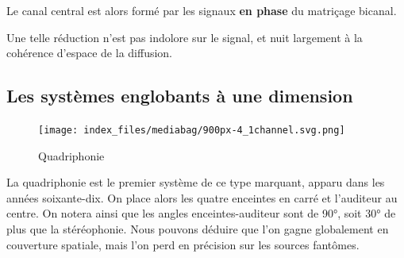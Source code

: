 \documentclass[
  letterpaper,
  DIV=11,
  numbers=noendperiod]{scrreprt}
\begin{document}
\begin{tcolorbox}[enhanced jigsaw, leftrule=.75mm, arc=.35mm, bottomtitle=1mm, colback=white, colbacktitle=quarto-callout-note-color!10!white, opacityback=0, left=2mm, rightrule=.15mm, opacitybacktitle=0.6, breakable, toptitle=1mm, titlerule=0mm, bottomrule=.15mm, toprule=.15mm, coltitle=black, title=\textcolor{quarto-callout-note-color}{\faInfo}\hspace{0.5em}{Note}]

Le canal central est alors formé par les signaux \textbf{en phase} du
matriçage bicanal.

\end{tcolorbox}

Une telle réduction n'est pas indolore sur le signal, et nuit largement
à la cohérence d'espace de la diffusion.

\hypertarget{sec-sys-surr-1L}{%
\subsection{Les systèmes englobants à une
dimension}\label{sec-sys-surr-1L}}

\begin{figure}

\begin{minipage}[t]{0.50\linewidth}

{\centering 


\caption{Quadriphonie}

}

\end{minipage}%
%
\begin{minipage}[t]{0.50\linewidth}

{\centering 

\texttt{[image: index\_files/mediabag/900px-4\_1channel.svg.png]}

}

\end{minipage}%

\end{figure}

La quadriphonie est le premier système de ce type marquant, apparu dans
les années soixante-dix. On place alors les quatre enceintes en carré et
l'auditeur au centre. On notera ainsi que les angles enceintes-auditeur
sont de 90°, soit 30° de plus que la stéréophonie. Nous pouvons déduire
que l'on gagne globalement en couverture spatiale, mais l'on perd en
précision sur les sources fantômes.
\end{document}
